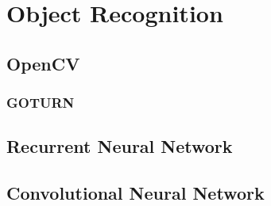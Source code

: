 \section{Object Recognition}

\subsection{OpenCV}

\subsubsection{GOTURN}


\subsection{Recurrent Neural Network}

\subsection{Convolutional Neural Network}
